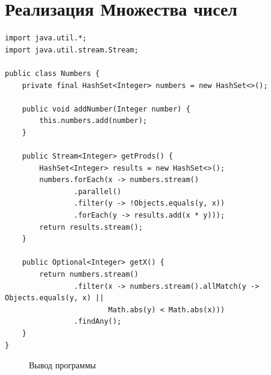 \documentclass[a4paper, 14pt]{extarticle}
\begin{document}
\section{Реализация Множества чисел}
{\scriptsize
\begin{verbatim}
import java.util.*;
import java.util.stream.Stream;

public class Numbers {
    private final HashSet<Integer> numbers = new HashSet<>();

    public void addNumber(Integer number) {
        this.numbers.add(number);
    }

    public Stream<Integer> getProds() {
        HashSet<Integer> results = new HashSet<>();
        numbers.forEach(x -> numbers.stream()
                .parallel()
                .filter(y -> !Objects.equals(y, x))
                .forEach(y -> results.add(x * y)));
        return results.stream();
    }

    public Optional<Integer> getX() {
        return numbers.stream()
                .filter(x -> numbers.stream().allMatch(y -> Objects.equals(y, x) ||
                        Math.abs(y) < Math.abs(x)))
                .findAny();
    }
}
\end{verbatim}
}

\begin{figure}[h] 
\caption{Вывод программы} 
\label{fig:image} 
\end{figure}
\end{document}
